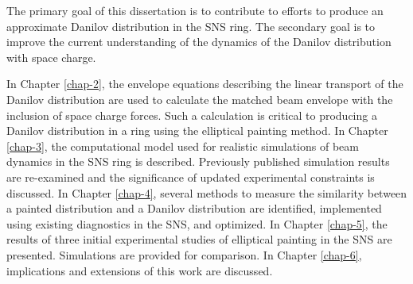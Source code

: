 The primary goal of this dissertation is to contribute to efforts to produce an approximate Danilov distribution in the SNS ring. The secondary goal is to improve the current understanding of the dynamics of the Danilov distribution with space charge. 

In Chapter \ref{chap-2}, the envelope equations describing the linear transport of the Danilov distribution are used to calculate the matched beam envelope with the inclusion of space charge forces. Such a calculation is critical to producing a Danilov distribution in a ring using the elliptical painting method. In Chapter \ref{chap-3}, the computational model used for realistic simulations of beam dynamics in the SNS ring is described. Previously published simulation results are re-examined and the significance of updated experimental constraints is discussed. In Chapter \ref{chap-4}, several methods to measure the similarity between a painted distribution and a Danilov distribution are identified, implemented using existing diagnostics in the SNS, and optimized. In Chapter \ref{chap-5}, the results of three initial experimental studies of elliptical painting in the SNS are presented. Simulations are provided for comparison. In Chapter \ref{chap-6}, implications and extensions of this work are discussed.